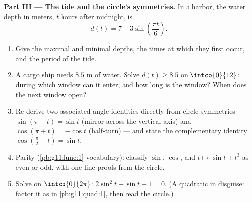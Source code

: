 \begin{problem}
\medskip
\noindent\textbf{Part III --- The tide and the circle's
symmetries.}
In a harbor, the water depth in meters, $t$ hours after
midnight, is
\[
d(t) = 7 + 3 \sin\!\left(\frac{\pi t}{6}\right).
\]
\begin{enumerate}[resume]
  \item Give the maximal and minimal depths, the times at which
        they first occur, and the period of the tide.
  \item A cargo ship needs $8.5$ m of water. Solve
        $d(t) \geq 8.5$ on $\intco{0}{12}$: during which window
        can it enter, and how long is the window? When does the
        next window open?
  \item Re-derive two associated-angle identities directly from
        circle symmetries --- $\sin(\pi - t) = \sin t$ (mirror
        across the vertical axis) and $\cos(\pi + t) = -\cos t$
        (half-turn) --- and state the complementary identity
        $\cos\left(\frac\pi2 - t\right) = \sin t$.
  \item Parity (\cref{pb:g11:func:1} vocabulary): classify
        $\sin$, $\cos$, and $t \mapsto \sin t + t^3$ as even or
        odd, with one-line proofs from the circle.
  \item Solve on $\intco{0}{2\pi}$:
        $2\sin^2 t - \sin t - 1 = 0$. (A quadratic in
        disguise: factor it as in \cref{pb:g11:quad:1}, then
        read the circle.)
\end{enumerate}


\end{problem}
